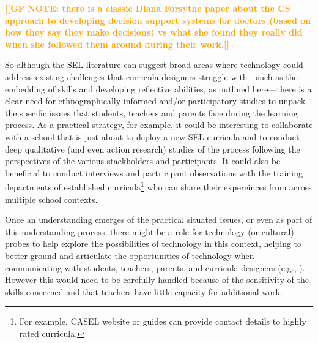 \documentclass[prodmode,acmtochi]{acmsmall}
\newcommand{\todo}[1]{\textrm{\textrm{\textcolor{LightBlue}{[[#1]]}}}}
\newcommand{\Geraldine}[1]{\textrm{\textbf{\textcolor{Orange}{[[#1]]}}}}
\begin{document}
\Geraldine{GF NOTE: there is a classic Diana Forsythe paper about the CS approach to developing decision support systems for doctors (based on how they say they make decisions) vs what she found they really did when she followed them around during their work.}

So although the SEL literature can suggest broad areas where technology could address existing challenges that curricula designers struggle with---such as the embedding of skills and developing reflective abilities, as outlined here---there is a clear need for ethnographically-informed and/or participatory studies to unpack the specific issues that students, teachers and parents face during the learning process. As a practical strategy, for example, it could be interesting to collaborate with a school that is just about to deploy a new SEL curricula and to conduct deep qualitative (and even action research) studies of the process following the perspectives of the various staekholders and participants. It could also be beneficial to conduct interviews and partricipant observations with the training departments of established curricula\footnote{For example, CASEL website or guides \cite{CASEL2003,CASEL2013} can provide contact details to highly rated curricula.} who can share their expereinces from across multiple school contexts. %
%

Once an understanding emerges of the practical situated issues, or even as part of this understanding process, there might be a role for technology (or cultural) probes to help explore the possibilities of technology in this context, helping to better ground and articulate the opportunities of technology when communicating with students, teachers, parents, and curricula designers (e.g., \cite{Kjeldskov2007,Hutchinson2003a,Vetere2005a,Lewin2010,Balaam2010,Marcu2012}). However this would need to be carefully handled because of the sensitivity of the skills concerned and that teachers have little capacity for additional work.
\end{document}
